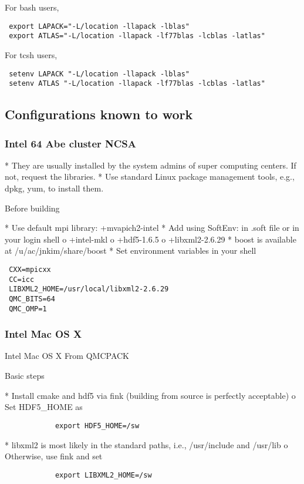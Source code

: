 For bash users,
\begin{verbatim}
 export LAPACK="-L/location -llapack -lblas"
 export ATLAS="-L/location -llapack -lf77blas -lcblas -latlas" 
\end{verbatim}
For tcsh users,
\begin{verbatim}
 setenv LAPACK "-L/location -llapack -lblas"
 setenv ATLAS "-L/location -llapack -lf77blas -lcblas -latlas"
\end{verbatim}

\subsection{Configurations known to work}
\subsubsection{Intel 64 Abe cluster \@ NCSA}
    *  They are usually installed by the system admins of super computing centers. If not, request the libraries.
    * Use standard Linux package management tools, e.g., dpkg, yum, to install them. 

Before building

    * Use default mpi library: +mvapich2-intel
    * Add using SoftEnv: in .soft file or in your login shell
          o +intel-mkl
          o +hdf5-1.6.5
          o +libxml2-2.6.29 
    * boost is available at /u/ac/jnkim/share/boost
    * Set environment variables in your shell 
\begin{verbatim}
 CXX=mpicxx
 CC=icc
 LIBXML2_HOME=/usr/local/libxml2-2.6.29
 QMC_BITS=64
 QMC_OMP=1
\end{verbatim}

\subsubsection{Intel Mac OS X}
Intel Mac OS X
From QMCPACK

Basic steps

    * Install cmake and hdf5 via fink (building from source is perfectly acceptable)
          o Set HDF5\_HOME as

\begin{verbatim}
            export HDF5_HOME=/sw
\end{verbatim}

    * libxml2 is most likely in the standard paths, i.e., /usr/include and /usr/lib
          o Otherwise, use fink and set

\begin{verbatim}
            export LIBXML2_HOME=/sw
\end{verbatim}

